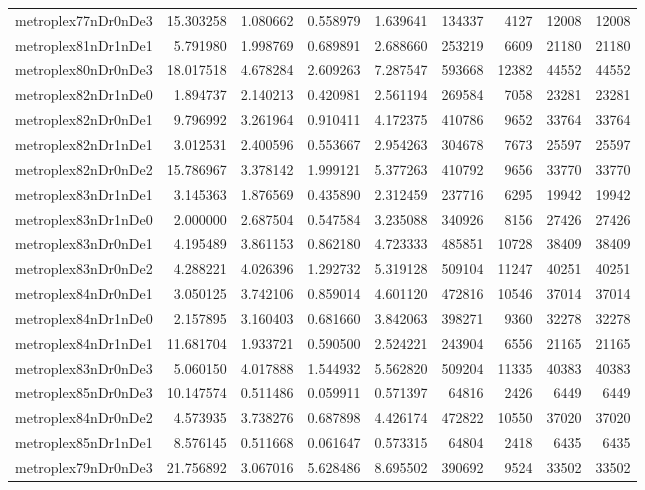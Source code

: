 \begin{longtable}{|l|r|r|r|r|r|r|r|r|}
metroplex77nDr0nDe3 & 15.303258 & 1.080662 & 0.558979 & 1.639641 & 134337 & 4127 & 12008 & 12008 \\
metroplex81nDr1nDe1 & 5.791980 & 1.998769 & 0.689891 & 2.688660 & 253219 & 6609 & 21180 & 21180 \\
metroplex80nDr0nDe3 & 18.017518 & 4.678284 & 2.609263 & 7.287547 & 593668 & 12382 & 44552 & 44552 \\
metroplex82nDr1nDe0 & 1.894737 & 2.140213 & 0.420981 & 2.561194 & 269584 & 7058 & 23281 & 23281 \\
metroplex82nDr0nDe1 & 9.796992 & 3.261964 & 0.910411 & 4.172375 & 410786 & 9652 & 33764 & 33764 \\
metroplex82nDr1nDe1 & 3.012531 & 2.400596 & 0.553667 & 2.954263 & 304678 & 7673 & 25597 & 25597 \\
metroplex82nDr0nDe2 & 15.786967 & 3.378142 & 1.999121 & 5.377263 & 410792 & 9656 & 33770 & 33770 \\
metroplex83nDr1nDe1 & 3.145363 & 1.876569 & 0.435890 & 2.312459 & 237716 & 6295 & 19942 & 19942 \\
metroplex83nDr1nDe0 & 2.000000 & 2.687504 & 0.547584 & 3.235088 & 340926 & 8156 & 27426 & 27426 \\
metroplex83nDr0nDe1 & 4.195489 & 3.861153 & 0.862180 & 4.723333 & 485851 & 10728 & 38409 & 38409 \\
metroplex83nDr0nDe2 & 4.288221 & 4.026396 & 1.292732 & 5.319128 & 509104 & 11247 & 40251 & 40251 \\
metroplex84nDr0nDe1 & 3.050125 & 3.742106 & 0.859014 & 4.601120 & 472816 & 10546 & 37014 & 37014 \\
metroplex84nDr1nDe0 & 2.157895 & 3.160403 & 0.681660 & 3.842063 & 398271 & 9360 & 32278 & 32278 \\
metroplex84nDr1nDe1 & 11.681704 & 1.933721 & 0.590500 & 2.524221 & 243904 & 6556 & 21165 & 21165 \\
metroplex83nDr0nDe3 & 5.060150 & 4.017888 & 1.544932 & 5.562820 & 509204 & 11335 & 40383 & 40383 \\
metroplex85nDr0nDe3 & 10.147574 & 0.511486 & 0.059911 & 0.571397 & 64816 & 2426 & 6449 & 6449 \\
metroplex84nDr0nDe2 & 4.573935 & 3.738276 & 0.687898 & 4.426174 & 472822 & 10550 & 37020 & 37020 \\
metroplex85nDr1nDe1 & 8.576145 & 0.511668 & 0.061647 & 0.573315 & 64804 & 2418 & 6435 & 6435 \\
metroplex79nDr0nDe3 & 21.756892 & 3.067016 & 5.628486 & 8.695502 & 390692 & 9524 & 33502 & 33502 \\

\end{longtable}
